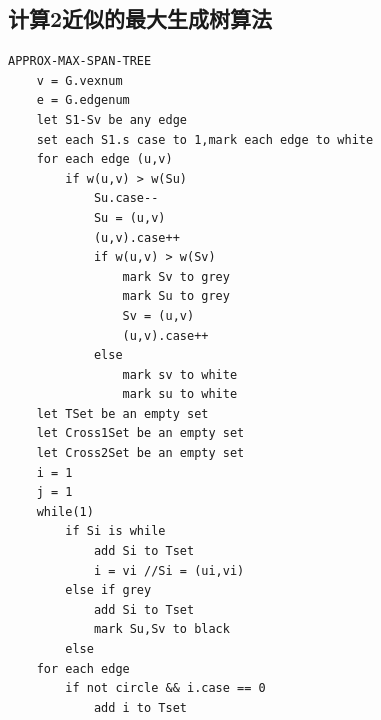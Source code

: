 \documentclass[cn,11pt,chinese]{elegantbook}
\begin{document}
\subsection{计算2近似的最大生成树算法}

\begin{lstlisting}
APPROX-MAX-SPAN-TREE
	v = G.vexnum 
	e = G.edgenum
	let S1-Sv be any edge
	set each S1.s case to 1,mark each edge to white
	for each edge (u,v)
		if w(u,v) > w(Su)
			Su.case--
			Su = (u,v)
			(u,v).case++
			if w(u,v) > w(Sv)
				mark Sv to grey
				mark Su to grey
				Sv = (u,v)
				(u,v).case++
			else
				mark sv to white
				mark su to white
	let TSet be an empty set
	let Cross1Set be an empty set
	let Cross2Set be an empty set
	i = 1
	j = 1
	while(1)
		if Si is while
			add Si to Tset
			i = vi //Si = (ui,vi)
		else if grey
			add Si to Tset
			mark Su,Sv to black
		else
	for each edge
		if not circle && i.case == 0
			add i to Tset
\end{lstlisting}
\end{document}
